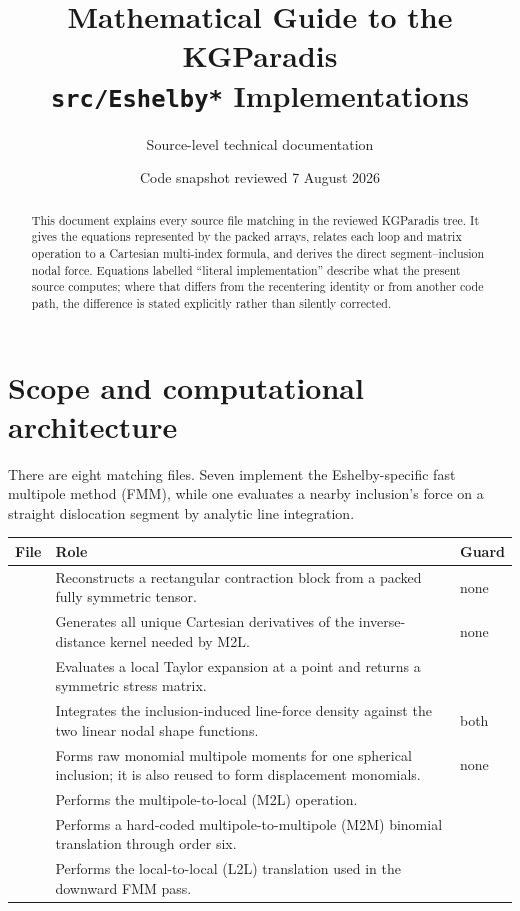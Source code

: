 \documentclass[11pt]{article}
\title{Mathematical Guide to the KGParadis\\
       \texttt{src/Eshelby*} Implementations}
\author{Source-level technical documentation}
\date{Code snapshot reviewed 7 August 2026}
\newcommand{\code}[1]{\texttt{\detokenize{#1}}}
\begin{document}
\maketitle

\begin{abstract}
This document explains every source file matching  in the
reviewed KGParadis tree.  It gives the equations represented by the packed
arrays, relates each loop and matrix operation to a Cartesian multi-index
formula, and derives the direct segment--inclusion nodal force.  Equations
labelled ``literal implementation'' describe what the present source computes;
where that differs from the recentering identity or from another code path, the
difference is stated explicitly rather than silently corrected.
\end{abstract}

\tableofcontents
\newpage

\section{Scope and computational architecture}

There are eight matching files.  Seven implement the Eshelby-specific fast
multipole method (FMM), while one evaluates a nearby inclusion's force on a
straight dislocation segment by analytic line integration.

\begin{center}
\small
\begin{tabularx}{\textwidth}{@{}P{0.35\textwidth}Y P{0.105\textwidth}@{}}
\toprule
File & Role & Guard \\
\midrule
{} &
  Reconstructs a rectangular contraction block from a packed fully symmetric
  tensor. & none \\
 &
  Generates all unique Cartesian derivatives of the inverse-distance kernel
  needed by M2L. & none \\
 &
  Evaluates a local Taylor expansion at a point and returns a symmetric stress
  matrix. & \code{ESHELBY} \\
 &
  Integrates the inclusion-induced line-force density against the two linear
  nodal shape functions. & both \\
 &
  Forms raw monomial multipole moments for one spherical inclusion; it is also
  reused to form displacement monomials. & none \\
 &
  Performs the multipole-to-local (M2L) operation. & \code{ESHELBY} \\
 &
  Performs a hard-coded multipole-to-multipole (M2M) binomial translation
  through order six. & \code{ESHELBY} \\
 &
  Performs the local-to-local (L2L) translation used in the downward FMM pass.
  & \code{ESHELBY} \\
\bottomrule
\end{tabularx}
\end{center}
\end{document}

